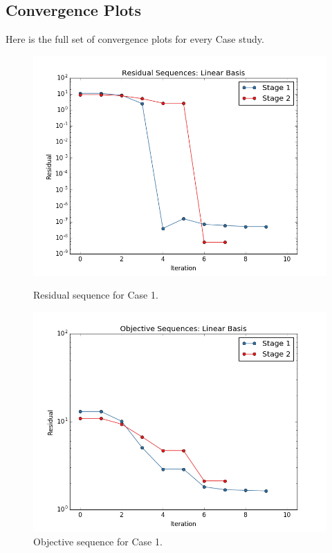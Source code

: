 \documentclass[]{aiaa-tc}%
\begin{document}
\subsection{Convergence Plots}
Here is the full set of convergence plots for every Case study.

\begin{figure}[!ht]
\centering
\begin{minipage}{.50\textwidth}
 \centering
 \includegraphics[width=.8\textwidth]{../images/residual_case1}
 \caption{Residual sequence for Case 1.}
 \label{fig:residual_case1}
\end{minipage}%
\begin{minipage}{.50\textwidth}
 \centering
 \includegraphics[width=.8\textwidth]{../images/objective_case1}
 \caption{Objective sequence for Case 1.}
 \label{fig:objective_case1}
\end{minipage}
\end{figure}
\end{document}
